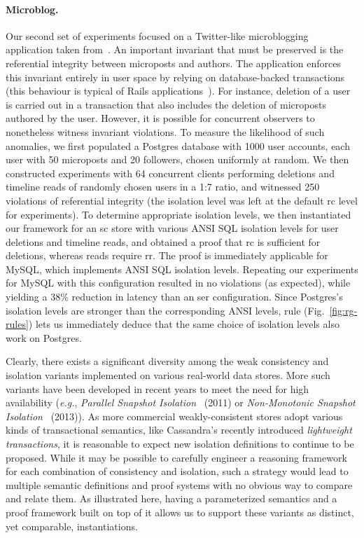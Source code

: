 \paragraph{Microblog.} Our second set of experiments focused on a
Twitter-like microblogging application taken from~\cite{railsbook}.
An important invariant that must be preserved is the referential
integrity between microposts and authors. The application enforces
this invariant entirely in user space by relying on database-backed
transactions (this behaviour is typical of Rails
applications~\cite{bailisferal}).  For instance, deletion of a user is
carried out in a transaction that also includes the deletion of
microposts authored by the user.  However, it is possible for
concurrent observers to nonetheless witness invariant violations. To
measure the likelihood of such anomalies, we first populated a
Postgres database with 1000 user accounts, each user with 50
microposts and 20 followers, chosen uniformly at random. We then
constructed experiments with 64 concurrent clients performing
deletions and timeline reads of randomly chosen users in a 1:7 ratio,
and witnessed 250 violations of referential integrity (the isolation
level was left at the default {\sc rc} level for experiments). To
determine appropriate isolation levels, we then instantiated our
framework for an {\sc sc} store with various ANSI SQL isolation levels
for user deletions and timeline reads, and obtained a proof that {\sc
rc} is sufficient for deletions, whereas reads require {\sc rr}. The
proof is immediately applicable for MySQL, which implements ANSI SQL
isolation levels. Repeating our experiments for MySQL with this
configuration resulted in no violations (as expected), while yielding
a 38\% reduction in latency than an {\sc ser} configuration.  Since
Postgres's isolation levels are stronger than the corresponding ANSI
levels,  rule (Fig.~\ref{fig:rg-rules}) lets us
immediately deduce that the same choice of isolation levels also work
on Postgres.

Clearly, there exists a significant diversity among the weak
consistency and isolation variants implemented on various real-world
data stores. More such variants have been developed in recent years to
meet the need for high availability (\emph{e.g.}, \emph{Parallel
  Snapshot Isolation}~\cite{psi} (2011) or \emph{Non-Monotonic
  Snapshot Isolation}~\cite{nmsi} (2013)).  As more commercial
weakly-consistent stores adopt various kinds of transactional
semantics, like Cassandra's recently introduced \emph{lightweight
  transactions}, it is reasonable to expect new isolation
definitions to continue to be proposed.  While it may be possible to
carefully engineer a reasoning framework for each combination of
consistency and isolation, such a strategy would lead to multiple
semantic definitions and proof systems with no obvious way to compare
and relate them. As illustrated here, having a parameterized semantics
and a proof framework built on top of it allows us to support these
variants as distinct, yet comparable, instantiations.

